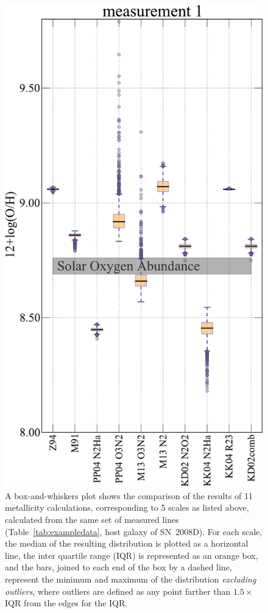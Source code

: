 \documentclass{emulateapj}
\begin{document}
\begin{figure}[ht!]
  \includegraphics[width=0.95\columnwidth]{exampledata_boxplot2000_m1.pdf}
   \caption{A box-and-whiskers plot shows the comparison of the results of 11 metallicity calculations, corresponding to 5 scales as listed above, calculated from the same set of measured lines (Table~\ref{tab:exampledata}, host galaxy of SN~2008D). For each scale, the median of the resulting distribution is plotted as a horizontal line, the inter quartile range (IQR) is represented as an orange box, and the bars, joined to each end of the box by a dashed line, represent the minimum and maximum of the distribution \emph{excluding outliers}, where outliers are defined as any point farther than $1.5\times$ IQR from the edges for the IQR.}
 \label{boxplot}
\end{figure}
\end{document}
